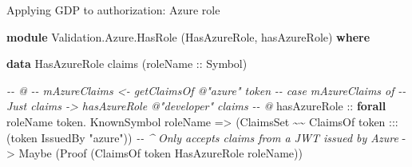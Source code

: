 \documentclass[
  9pt,
  ignorenonframetext,
]{beamer}
\newenvironment{Shaded}{}{}
\newcommand{\CommentTok}[1]{\textcolor[rgb]{0.38,0.63,0.69}{\textit{#1}}}
\newcommand{\DataTypeTok}[1]{\textcolor[rgb]{0.56,0.13,0.00}{#1}}
\newcommand{\KeywordTok}[1]{\textcolor[rgb]{0.00,0.44,0.13}{\textbf{#1}}}
\newcommand{\NormalTok}[1]{#1}
\newcommand{\OperatorTok}[1]{\textcolor[rgb]{0.40,0.40,0.40}{#1}}
\newcommand{\OtherTok}[1]{\textcolor[rgb]{0.00,0.44,0.13}{#1}}
\newcommand{\StringTok}[1]{\textcolor[rgb]{0.25,0.44,0.63}{#1}}
\begin{document}
\begin{frame}[fragile]{Applying GDP to authorization: Azure role}
\protect\hypertarget{applying-gdp-to-authorization-azure-role}{}
\begin{Shaded}
\begin{Highlighting}[]
\KeywordTok{module} \DataTypeTok{Validation.Azure.HasRole} 
\NormalTok{  (}\DataTypeTok{HasAzureRole}\NormalTok{, hasAzureRole) }\KeywordTok{where}

\KeywordTok{data} \DataTypeTok{HasAzureRole}\NormalTok{ claims (}\OtherTok{roleName ::} \DataTypeTok{Symbol}\NormalTok{)}

\CommentTok{{-}{-} @}
\CommentTok{{-}{-}   mAzureClaims \textless{}{-} getClaimsOf @"azure" token}
\CommentTok{{-}{-}   case mAzureClaims of }
\CommentTok{{-}{-}     Just claims {-}\textgreater{} hasAzureRole @"developer" claims}
\CommentTok{{-}{-} @}
\NormalTok{hasAzureRole}
\OtherTok{  ::} \KeywordTok{forall}\NormalTok{ roleName token}\OperatorTok{.} \DataTypeTok{KnownSymbol}\NormalTok{ roleName }
  \OtherTok{=\textgreater{}}\NormalTok{ (}\DataTypeTok{ClaimsSet} \OperatorTok{\textasciitilde{}\textasciitilde{}} \DataTypeTok{ClaimsOf}\NormalTok{ token }\OperatorTok{:::}\NormalTok{ (token }\OtherTok{\textasciigrave{}IssuedBy\textasciigrave{}} \StringTok{"azure"}\NormalTok{))}
  \CommentTok{{-}{-} \^{} Only accepts claims from a JWT issued by Azure}
  \OtherTok{{-}\textgreater{}} \DataTypeTok{Maybe}\NormalTok{ (}\DataTypeTok{Proof}\NormalTok{ (}\DataTypeTok{ClaimsOf}\NormalTok{ token }\OtherTok{\textasciigrave{}HasAzureRole\textasciigrave{}}\NormalTok{ roleName))}
\end{Highlighting}
\end{Shaded}






\end{frame}
\end{document}

